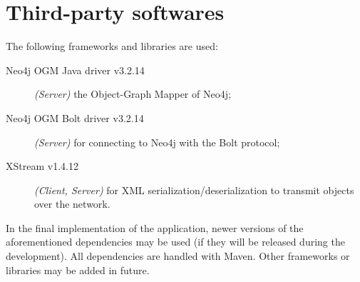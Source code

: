 \section{Third-party softwares}\label{sec:dependencies}

The following frameworks and libraries are used:

\begin{description}
	\item[Neo4j OGM Java driver v3.2.14] \textit{(Server)} the Object-Graph
		Mapper of Neo4j;
	\item[Neo4j OGM Bolt driver v3.2.14] \textit{(Server)} for connecting to
		Neo4j with the Bolt protocol;
	\item[XStream v1.4.12] \textit{(Client, Server)} for XML
		serialization/deserialization to transmit objects over the
		network.
\end{description}

In the final implementation of the application, newer versions of the
aforementioned dependencies may be used (if they will be released during the
development). All dependencies are handled with Maven. Other frameworks or
libraries may be added in future.
